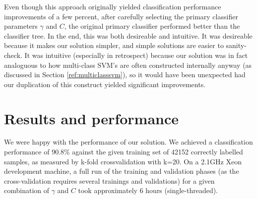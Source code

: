 \documentclass{netsec2012}
\begin{document}
Even though this approach originally yielded classification performance improvements of a few
percent, after carefully selecting the primary classifier parameters $\gamma$ and $C$, the original
primary classifier performed better than the classifier tree.  In the end, this was both desireable
and intuitive.  It was desireable because it makes our solution simpler, and simple solutions are
easier to sanity-check.  It was intuitive (especially in retrospect) because our solution was in
fact analoguous to how multi-class SVM's are often constructed internally anyway (as discussed in
Section \ref{ref:multiclasssvm}), so it would have been unexpected had our duplication of this
construct yielded significant improvements.


\section{Results and performance}

We were happy with the performance of our solution.  We achieved a classification performance of
90.8\% against the given training set of 42152 correctly labelled samples, as measured by k-fold
crossvalidation with k=20.  On a 2.1GHz Xeon development machine, a full run of the training and
validation phases (as the cross-validation requires several trainings and validations) for a given
combination of $\gamma$ and $C$ took approximately 6 hours (single-threaded).
\end{document}
